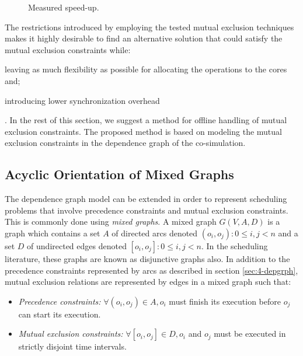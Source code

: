 \begin{figure}[phbt]
\centering

\caption{Measured speed-up.}
\label{fig:real-speedup}
\end{figure}


The restrictions introduced by employing the tested mutual exclusion techniques makes it highly desirable to find an alternative solution that could satisfy the mutual exclusion constraints while: \begin{inlinelist} \item leaving as much flexibility as possible for allocating the operations to the cores and; \item introducing lower synchronization overhead \end{inlinelist}. In the rest of this section, we suggest a method for offline handling of mutual exclusion constraints. The proposed method is based on modeling the mutual exclusion constraints in the dependence graph of the co-simulation.

\subsection{Acyclic Orientation of Mixed Graphs}

The dependence graph model can be extended in order to represent scheduling problems that involve precedence constraints and mutual exclusion constraints. This is commonly done using \textit{mixed graphs}. A mixed graph $G(V,A,D)$ is a graph which contains a set $A$ of directed arcs denoted $(o_i,o_j): 0 \leq i, j < n$ and a set $D$ of undirected edges denoted $[o_i,o_j]: 0 \leq i, j < n$. In the scheduling literature, these graphs are known as disjunctive graphs also. In addition to the precedence constraints represented by arcs as described in section \ref{sec:4-depgrph}, mutual exclusion relations are represented by edges in a mixed graph such that: 
\begin{itemize}
\item \textit{Precedence constraints:} $\forall (o_i,o_j) \in A, o_i$ must finish its execution before $o_j$ can start its execution.  
\item \textit{Mutual exclusion constraints:} $\forall [o_i,o_j] \in D, o_i$ and $o_j$ must be executed in strictly disjoint time intervals.
\end{itemize}

